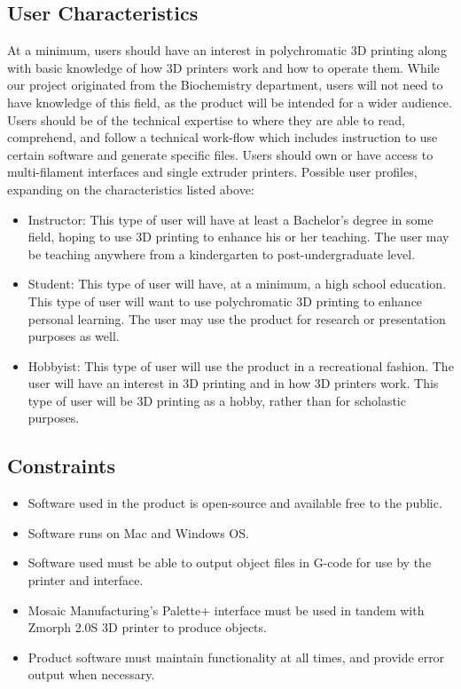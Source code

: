 \documentclass[letterpaper, onecolumn, draftclsnofoot, 10pt, compsoc]{IEEEtran}
\begin{document}
\subsection{User Characteristics} %
At a minimum, users should have an interest in polychromatic 3D printing along with basic knowledge of how 3D printers work and how to operate them. 
While our project originated from the Biochemistry department, users will not need to have knowledge of this field, as the product will be intended for a wider audience.
Users should be of the technical expertise to where they are able to read, comprehend, and follow a technical work-flow which includes instruction to use certain software and generate specific files. 
Users should own or have access to multi-filament interfaces and single extruder printers. 
Possible user profiles, expanding on the characteristics listed above:
\begin{itemize}
	\item Instructor: This type of user will have at least a Bachelor's degree in some field, hoping to use 3D printing to enhance his or her teaching. 
    The user may be teaching anywhere from a kindergarten to post-undergraduate level. 
    \item Student: This type of user will have, at a minimum, a high school education. 
    This type of user will want to use polychromatic 3D printing to enhance personal learning. 
    The user may use the product for research or presentation purposes as well. 
    \item Hobbyist: This type of user will use the product in a recreational fashion.
    The user will have an interest in 3D printing and in how 3D printers work. 
    This type of user will be 3D printing as a hobby, rather than for scholastic purposes. 
\end{itemize}

\subsection{Constraints} %
\begin{itemize}
	\item Software used in the product is open-source and available free to the public.
    \item Software runs on Mac and Windows OS.
    \item Software used must be able to output object files in G-code for use by the printer and interface.
    \item Mosaic Manufacturing's Palette+ interface must be used in tandem with Zmorph 2.0S 3D printer to produce objects.
    \item Product software must maintain functionality at all times, and provide error output when necessary. 
\end{itemize}
\end{document}
